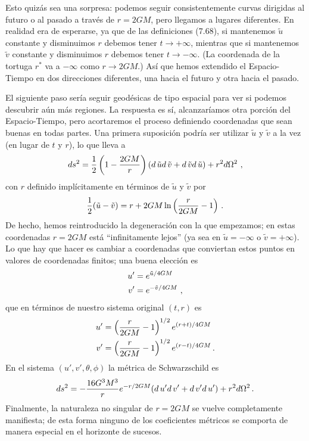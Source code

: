 \documentclass[11pt,b5paper,openany,twoside]{book}
\begin{document}
Esto quizás sea una sorpresa: podemos seguir consistentemente curvas dirigidas al futuro o al pasado a través de $r=2GM$, pero llegamos a lugares diferentes.
En realidad era de esperarse, ya que de las definiciones (7.68), si mantenemos $\tilde u$ constante y disminuimos $r$ debemos tener $t\rightarrow +\infty$, mientras que si mantenemos $\tilde v$ constante y disminuimos $r$ debemos tener $t\rightarrow -\infty$.
(La coordenada de la tortuga $r^*$ va a $-\infty$ como $r\rightarrow 2GM$.)
Así que hemos extendido el Espacio-Tiempo en dos direcciones diferentes, una hacia el futuro y otra hacia el pasado.

El siguiente paso sería seguir geodésicas de tipo espacial para ver si podemos descubrir aún más regiones.
La respuesta es sí, alcanzaríamos otra porción del Espacio-Tiempo, pero acortaremos el proceso definiendo coordenadas que sean buenas en todas partes.
Una primera suposición podría ser utilizar $\tilde u$ y $\tilde v$ a la vez (en lugar de $t$ y $r$), lo que lleva a
\begin{equation}
ds^2 = {1\over 2}\left(1-{{2GM}\over r}\right)( d\,{\tilde u}
 d\,{\tilde v}+ d\,{\tilde v} d\,{\tilde u}) +r^2 d\Omega^2\ ,\label{7.73}
\end{equation}
con $r$ definido implícitamente en términos de $\tilde u$ y $\tilde v$ por
\begin{equation}
{1\over 2}(\tilde u-\tilde v)=
r+2GM \ln\left({{r}\over{2GM}}-1\right)\,.\label{7.74}
\end{equation}
De hecho, hemos reintroducido la degeneración con la que empezamos; en estas coordenadas $r=2GM$ está ``infinitamente lejos'' (ya sea en $\tilde u=-\infty$ o $\tilde v=+\infty$).
Lo que hay que hacer es cambiar a coordenadas que conviertan estos puntos en valores de coordenadas finitos; una buena elección es
\begin{align}
u'  &=  e^{\tilde u/4GM}  \notag \\  v'  &=  e^{-\tilde v/4GM}\ ,
\label{7.75}
\end{align}
que en términos de nuestro sistema original $(t,r)$ es
\begin{align}
u'  &=  \left({{r}\over{2GM}}-1\right)^{1/2}e^{(r+t)/4GM}  \notag \\
v'  &=  \left({{r}\over{2GM}}-1\right)^{1/2}e^{(r-t)/4GM}\,.
\label{7.76}
\end{align}
En el sistema $(u',v',\theta,\phi)$ la métrica de Schwarzschild es
\begin{equation}
ds^2 =-{{16 G^3M^3}\over{r}}e^{-r/2GM}( d\,u'  d\,v'+  d\,v'  d\,u')
+r^2 d\Omega^2\,.\label{7.77}
\end{equation}
Finalmente, la naturaleza no singular de $r=2GM$ se vuelve completamente manifiesta; de esta forma ninguno de los coeficientes métricos se comporta de manera especial en el horizonte de sucesos.
\end{document}
